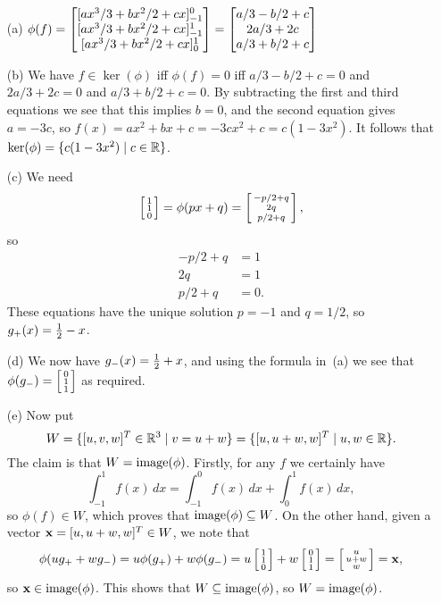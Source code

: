  \begin{itemize}
  \item[(a)] $\displaystyle
    \phi(f) =
     \left[\begin{matrix}
      [ax^3/3+bx^2/2+cx]_{-1}^0 \\
      [ax^3/3+bx^2/2+cx]_{-1}^1 \\
      [ax^3/3+bx^2/2+cx]_0^1
     \end{matrix}\right] =
     \left[\begin{matrix}
      a/3-b/2+c \\ 2a/3+2c \\ a/3+b/2+c
     \end{matrix}\right]
   $
  \item[(b)] We have $f\in\ker(\phi)$ iff $\phi(f)=0$ iff
   $a/3-b/2+c=0$ and $2a/3+2c=0$ and $a/3+b/2+c=0$.  By
   subtracting the first and third equations we see that
   this implies $b=0$, and the second equation gives
   $a=-3c$, so $f(x)=ax^2+bx+c=-3cx^2+c=c(1-3x^2)$.  It
   follows that $\ker(\phi)=\{c(1-3x^2)\;|\; c\in{\mathbb{R}}\}$.
  \item[(c)] We need
   \[ \left[\begin{smallmatrix} 1\\1\\0\end{smallmatrix}\right] = \phi(px+q) =
      \left[\begin{smallmatrix} -p/2+q \\ 2q \\ p/2+q \end{smallmatrix}\right], \]
   so
   \begin{align*}
    -p/2 + q &= 1  \\
    2q       &= 1  \\
     p/2 + q &= 0.
   \end{align*}
   These equations have the unique solution  $p=-1$ and
   $q=1/2$, so $g_+(x)={\textstyle\frac{1}{2}} - x$.
  \item[(d)] We now have $g_-(x)={\textstyle\frac{1}{2}}+x$, and using the
   formula in~(a) we see that $\phi(g_-)=\left[\begin{smallmatrix} 0\\1\\1\end{smallmatrix}\right]$
   as required.
  \item[(e)] Now put
   \[ W = \{[u,v,w]^T\in{\mathbb{R}}^3\;|\; v=u+w\} =
          \{[u,u+w,w]^T\;|\; u,w\in{\mathbb{R}}\}.
   \]
   The claim is that $W=\operatorname{image}(\phi)$.  Firstly, for any $f$
   we certainly have
   \[ \int_{-1}^1 f(x)\,dx =
      \int_{-1}^0 f(x)\,dx +
      \int_0^1 f(x)\,dx,
   \]
   so $\phi(f)\in W$, which proves that $\operatorname{image}(\phi)\subseteq W$.
   On the other hand, given a vector $\mathbf{x}=[u,u+w,w]^T\in W$,
   we note that
   \[ \phi(ug_++wg_-) =
       u\phi(g_+) + w \phi(g_-) =
       u \left[\begin{smallmatrix} 1\\1\\0\end{smallmatrix}\right] + w \left[\begin{smallmatrix} 0\\1\\1\end{smallmatrix}\right] =
       \left[\begin{smallmatrix} u\\ u+w\\ w\end{smallmatrix}\right] = \mathbf{x},
   \]
   so $\mathbf{x}\in\operatorname{image}(\phi)$.  This shows that
   $W\subseteq\operatorname{image}(\phi)$, so $W=\operatorname{image}(\phi)$.
 \end{itemize}
\EndDeferredSolution

